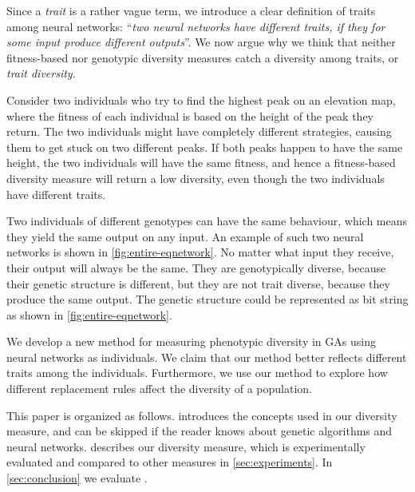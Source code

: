 Since a \emph{trait} is a rather vague term, we introduce a clear definition of traits among neural networks: ``\emph{two neural networks have different traits, if they for some input produce different outputs}''. We now argue why we think that neither fitness-based nor genotypic diversity measures catch a diversity among traits, or \emph{trait diversity}.

Consider two individuals who try to find the highest peak on an elevation map, where the fitness of each individual is based on the height of the peak they return. The two individuals might have completely different strategies, causing them to get stuck on two different peaks. If both peaks happen to have the same height, the two individuals will have the same fitness, and hence a fitness-based diversity measure will return a low diversity, even though the two individuals have different traits.

Two individuals of different genotypes can have the same behaviour, which means they yield the same output on any input. An example of such two neural networks is shown in \cref{fig:entire-eqnetwork}. No matter what input they receive, their output will always be the same. They are genotypically diverse, because their genetic structure is different, but they are not trait diverse, because they produce the same output. The genetic structure could be represented as bit string as shown in \cref{fig:entire-eqnetwork}.
%

%
We develop a new method for measuring phenotypic diversity in GAs using neural networks as individuals. We claim that our method better reflects different traits among the individuals. Furthermore, we use our method to explore how different replacement rules affect the diversity of a population.

This paper is organized as follows.  introduces the concepts used in our diversity measure, and can be skipped if the reader knows about genetic algorithms and neural networks.  describes our diversity measure, which is experimentally evaluated and compared to other measures in \cref{sec:experiments}. In \cref{sec:conclusion} we evaluate \dia.


